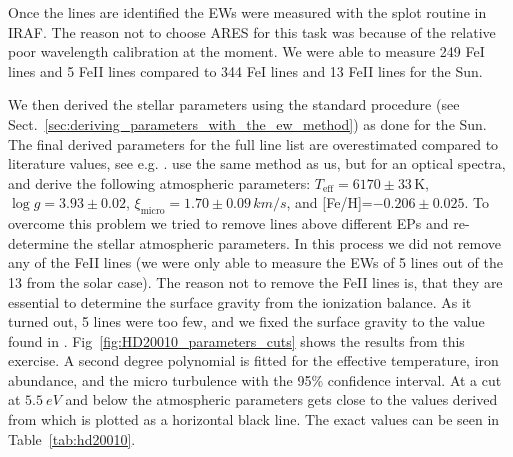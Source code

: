 \documentclass{aa}
\begin{document}
Once the lines are identified the EWs were measured with the splot
routine in IRAF. The reason not to choose ARES for this task was because
of the relative poor wavelength calibration at the moment. We were able
to measure 249 FeI lines and 5 FeII lines compared to 344 FeI lines and
13 FeII lines for the Sun.

We then derived the stellar parameters using the standard procedure
(see Sect.~\ref{sec:deriving_parameters_with_the_ew_method}) as
done for the Sun. The final derived parameters for the full line
list are overestimated compared to literature values, see e.g.
\citet{Mortier2013,Gonzalez2010}. \cite{Gonzalez2010} use the same
method as us, but for an optical spectra, and derive the following
atmospheric parameters: $T_\mathrm{eff}=6170\pm33\,\si{\kelvin}$,
$\log g=3.93\pm0.02$, $\xi_\mathrm{micro}=1.70\pm0.09\,\si{km/s}$,
and [Fe/H]=$-0.206\pm0.025$. To overcome this problem we tried
to remove lines above different EPs and re-determine the stellar
atmospheric parameters. In this process we did not remove any of the
FeII lines (we were only able to measure the EWs of 5 lines out of
the 13 from the solar case). The reason not to remove the FeII lines
is, that they are essential to determine the surface gravity from the
ionization balance. As it turned out, 5 lines were too few, and we
fixed the surface gravity to the value found in \cite{Gonzalez2010}.
Fig~\ref{fig:HD20010_parameters_cuts} shows the results from this
exercise. A second degree polynomial is fitted for the effective
temperature, iron abundance, and the micro turbulence with the
95\% confidence interval. At a cut at $\SI{5.5}{eV}$ and below
the atmospheric parameters gets close to the values derived from
\cite{Gonzalez2010} which is plotted as a horizontal black line. The
exact values can be seen in Table~\ref{tab:hd20010}.
\end{document}
